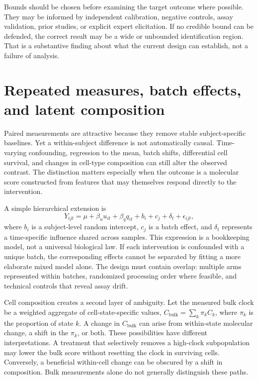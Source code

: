 \documentclass[10pt,a4paper]{article}
\begin{document}
Bounds should be chosen before examining the target outcome where possible. They may be informed by independent calibration, negative controls, assay validation, prior studies, or explicit expert elicitation. If no credible bound can be defended, the correct result may be a wide or unbounded identification region. That is a substantive finding about what the current design can establish, not a failure of analysis.

\section{Repeated measures, batch effects, and latent composition}
Paired measurements are attractive because they remove stable subject-specific baselines. Yet a within-subject difference is not automatically causal. Time-varying confounding, regression to the mean, batch shifts, differential cell survival, and changes in cell-type composition can still alter the observed contrast. The distinction matters especially when the outcome is a molecular score constructed from features that may themselves respond directly to the intervention.

A simple hierarchical extension is
\[
Y_{ijt}=\mu+\beta_u u_{it}+\beta_q q_{it}+b_i+c_j+\delta_t+\epsilon_{ijt},
\]
where \(b_i\) is a subject-level random intercept, \(c_j\) is a batch effect, and \(\delta_t\) represents a time-specific influence shared across samples. This expression is a bookkeeping model, not a universal biological law. If each intervention is confounded with a unique batch, the corresponding effects cannot be separated by fitting a more elaborate mixed model alone. The design must contain overlap: multiple arms represented within batches, randomized processing order where feasible, and technical controls that reveal assay drift.

Cell composition creates a second layer of ambiguity. Let the measured bulk clock be a weighted aggregate of cell-state-specific values, \(C_{\mathrm{bulk}}=\sum_k \pi_k C_k\), where \(\pi_k\) is the proportion of state \(k\). A change in \(C_{\mathrm{bulk}}\) can arise from within-state molecular change, a shift in the \(\pi_k\), or both. These possibilities have different interpretations. A treatment that selectively removes a high-clock subpopulation may lower the bulk score without resetting the clock in surviving cells. Conversely, a beneficial within-cell change can be obscured by a shift in composition. Bulk measurements alone do not generally distinguish these paths.
\end{document}
